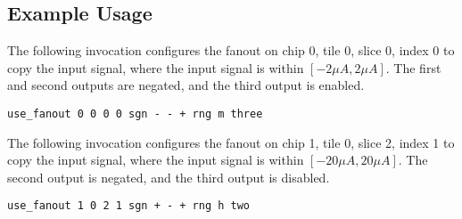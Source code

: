 \subsection{Example Usage}

The following invocation configures the fanout on chip 0, tile 0, slice 0, index
0 to copy the input signal, where the input signal is within $[-2 \mu A, 2 \mu
A]$. The first and second outputs are negated, and the third output is enabled.

\begin{lstlisting}
use_fanout 0 0 0 0 sgn - - + rng m three
\end{lstlisting}

The following invocation configures the fanout on chip 1, tile 0, slice 2, index
1 to copy the input signal, where the input signal is within $[-20 \mu A, 20 \mu
A]$. The second output is negated, and the third output is disabled.

\begin{lstlisting}
use_fanout 1 0 2 1 sgn + - + rng h two 
\end{lstlisting}
